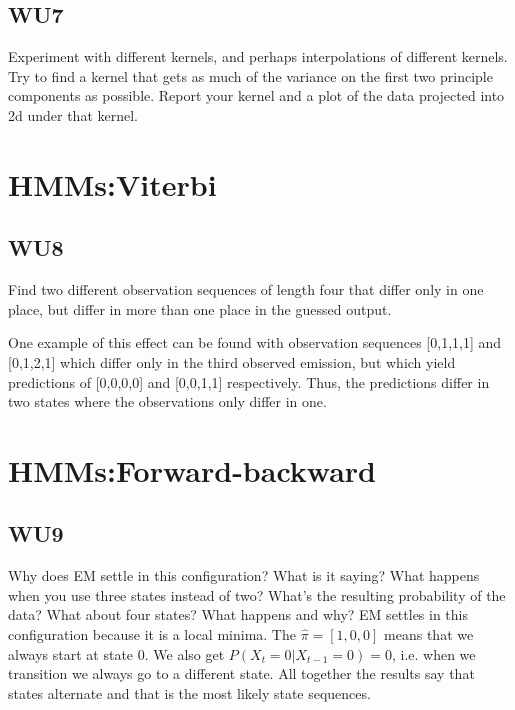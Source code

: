 \documentclass[a4paper,11pt]{article}
\begin{document}
\subsection{WU7}
\textsf{Experiment with different kernels, and perhaps interpolations 
of different kernels. Try to find a kernel that gets as much of the 
variance on the first two principle components as possible. Report your 
kernel and a plot of the data projected into 2d under that kernel.}\vspace{0.1in}

\pagebreak
\section{HMMs:Viterbi}
\subsection{WU8}
\textsf{Find two different observation sequences of length four that
differ only in one place, but differ in more than one place in the
guessed output.}\vspace{0.1in}


One example of this effect can be found with observation sequences
[0,1,1,1] and [0,1,2,1] which differ only in the third observed emission,
but which yield predictions of [0,0,0,0] and [0,0,1,1] respectively.
Thus, the predictions differ in two states where the observations only
differ in one.

\section{HMMs:Forward-backward}
\subsection{WU9}
\textsf{Why does EM settle in this configuration? What is it saying? 
What happens when you use three states instead of two? 
What's the resulting probability of the data? 
What about four states? What happens and why?}\vspace{0.1in}
EM settles in this configuration because it is a local minima. The
$\hat \pi = [1,0,0]$ means that we always start at state 0. We also get $P(X_t=0|X_{t-1}=0)= 0$,
i.e. when we transition we always go to a different state. All
together the results say that states alternate and that is the most
likely state sequences.
\end{document}
